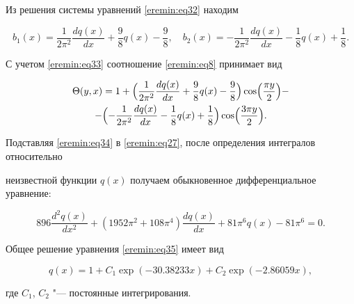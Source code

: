 Из решения системы уравнений \eqref{eremin:eq32} находим

\begin{equation}

\label{eremin:eq33}

b_1 (x)=\frac{1}{2\pi

^2}\frac{dq(x)}{dx}+\frac{9}{8}q(x)-\frac{9}{8}, \quad b_2

(x)=-\frac{1}{2\pi^2}\frac{dq(x)}{dx}-\frac{1}{8}q(x)+\frac{1}{8}.

\end{equation}

С учетом \eqref{eremin:eq33} соотношение \eqref{eremin:eq8} принимает вид

\begin{multline}

\label{eremin:eq34}

\Theta (y,x)=1+\Bigl(\frac{1}{2\pi ^2}\frac{dq(x)}{dx}+\frac{9}{8}q(x)-\frac{9}{8} \Bigr)\cos \Bigl(

\frac{\pi y}{2}\Bigr)- \\

 -\Bigl( -\frac{1}{2\pi^2}\frac{dq(x)}{dx}-\frac{1}{8}q(x)+\frac{1}{8}

\Bigr)\cos \Bigl(\frac{3\pi y}{2} \Big).

\end{multline}

Подставляя \eqref{eremin:eq34} в \eqref{eremin:eq27}, после определения интегралов относительно

неизвестной функции $q(x)$ получаем обыкновенное дифференциальное уравнение:

\begin{equation}

\label{eremin:eq35}

896\frac{d^2q(x)}{dx^2}+(1952\pi^2+108\pi^4)\frac{dq(x)}{dx}+81\pi

^6q(x)-81\pi^6=0.

\end{equation}

Общее решение уравнения \eqref{eremin:eq35} имеет вид

\begin{equation}

\label{eremin:eq36}

q(x)=1+C_1 \exp (-30.38233 x)+C_2 \exp (-2.86059 x),

\end{equation}

где $C_1$, $C_2$ "--- постоянные интегрирования.



